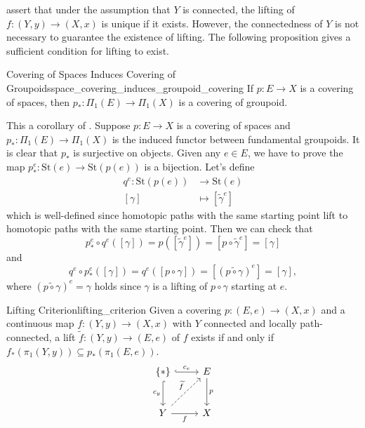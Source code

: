 \documentclass{report}
\begin{document}
 assert that under the assumption that $Y$ is connected, the lifting of $f:(Y,y)\to(X,x)$ is unique if it exists. However, the connectedness of $Y$ is not necessary to guarantee the existence of lifting. The following proposition gives a sufficient condition for lifting to exist.


\begin{corollary}{Covering of Spaces Induces Covering of Groupoids}{space_covering_induces_groupoid_covering}
	If $p : E \to X$ is a covering of spaces, then $p_*: \Pi_1(E) \to \Pi_1(X)$ is a covering of groupoid.
\end{corollary}

\begin{prf}
	This a corollary of . Suppose $p : E \to X$ is a covering of spaces and $p_*: \Pi_1(E) \to \Pi_1(X)$ is the induced functor between fundamental groupoids. It is clear that $p_*$ is surjective on objects. Given any $e\in E$,	we have to prove the map $p_*^{e}:\mathrm{St}(e)\to\mathrm{St}(p(e))$ is a bijection. Let's define
	\begin{align*}
		q^e:\mathrm{St}(p(e)) & \to \mathrm{St}(e)             \\
		[\gamma]              & \mapsto [\widetilde{\gamma}^e]
	\end{align*}
	which is well-defined since homotopic paths with the same starting point lift to homotopic paths with the same starting point. Then we can check that
	\[
		p_*^{e}\circ q^e([\gamma])=p([\widetilde{\gamma}^e])=[p\circ\widetilde{\gamma}^e]=[\gamma]
	\]
	and
	\[
		q^e\circ p_*^{e}([\gamma])=q^e([p\circ\gamma])=\left[\left(\widetilde{p\circ\gamma}\right)^e\right]=[\gamma],
	\]
	where $\left(\widetilde{p\circ\gamma}\right)^e=\gamma$ holds since $\gamma$ is a lifting of $p\circ\gamma$ starting at $e$.
\end{prf}


\begin{proposition}{Lifting Criterion}{lifting_criterion}
	Given a covering $p:\left(E, e\right) \rightarrow\left(X, x\right)$ and a continuous map $f:\left(Y, y\right) \rightarrow\left(X, x\right)$ with $Y$ connected and locally path-connected, a lift $\widetilde{f}:\left(Y, y\right) \rightarrow\left(E, e\right)$ of $f$ exists if and only if $f_*\left(\pi_1\left(Y, y\right)\right) \subseteq p_*\left(\pi_1\left(E, e\right)\right)$.
	\[
		\begin{tikzcd}[ampersand replacement=\&]
			\{*\} \arrow[r, "c_e",hook] \arrow[d, "c_y"', hook]                      \& E \arrow[d, "p"] \\ [+8pt]
			Y \arrow[r, "f"'] \arrow[ru, "\widetilde{f}", dashed] \& X
		\end{tikzcd}
	\]
\end{proposition}
\end{document}
